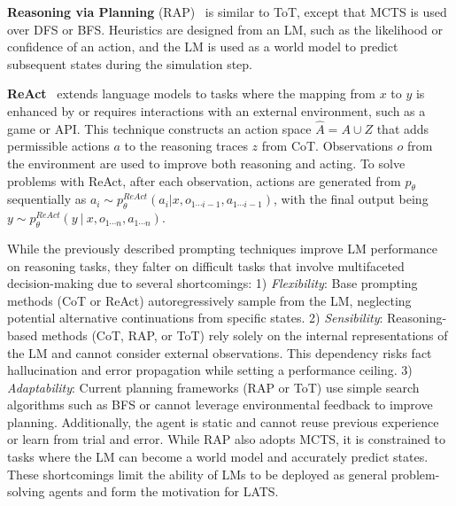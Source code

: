 \documentclass{article} \usepackage{iclr2024_conference,times}
\begin{document}
\textbf{Reasoning via Planning} (RAP)~\citep{hao2023reasoning} is similar to ToT, except that MCTS is used over DFS or BFS. Heuristics are designed from an LM, such as the likelihood or confidence of an action, and the LM is used as a world model to predict subsequent states during the simulation step.

\textbf{ReAct}~\citep{yao2023react} extends language models to tasks where the mapping from \( x \) to \( y \) is enhanced by or requires interactions with an external environment, such as a game or API. This technique constructs an action space $\hat{A} = A \cup Z$ that adds permissible actions $a$ to the reasoning traces $z$ from CoT. Observations $o$ from the environment are used to improve both reasoning and acting. To solve problems with ReAct, after each observation, actions are generated from $p_\theta$ sequentially as \( a_i \sim p_\theta^{ReAct}(a_i | x, o_{1\cdots i-1}, a_{1\cdots i-1}) \), with the final output being \( y \sim p_\theta^{ReAct}(y~|~x, o_{1\cdots n}, a_{1\cdots n}) \). 


While the previously described prompting techniques improve LM performance on reasoning tasks, they falter on difficult tasks that involve multifaceted decision-making due to several shortcomings: 1) \textit{Flexibility}: Base prompting methods (CoT or ReAct) autoregressively sample from the LM, neglecting potential alternative continuations from specific states. 2) \textit{Sensibility}: Reasoning-based methods (CoT, RAP, or ToT) rely solely on the internal representations of the LM and cannot consider external observations. This dependency risks fact hallucination and error propagation while setting a performance ceiling. 3) \textit{Adaptability}: Current planning frameworks (RAP or ToT) use simple search algorithms such as BFS or cannot leverage environmental feedback to improve planning. Additionally, the agent is static and cannot reuse previous experience or learn from trial and error. While RAP also adopts MCTS, it is constrained to tasks where the LM can become a world model and accurately predict states. These shortcomings limit the ability of LMs to be deployed as general problem-solving agents and form the motivation for LATS.
\end{document}
